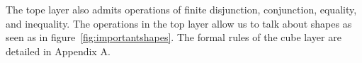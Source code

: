\documentclass[main.tex]{subfiles}
\begin{document}
The tope layer also admits operations of finite disjunction, conjunction, equality, and inequality. The 
operations in the top layer allow us to talk about shapes as seen as in figure~\ref{fig:importantshapes}. The formal rules
of the cube layer are detailed in Appendix A.


\ifSubfilesClassLoaded{%
    
    
}{}
\end{document}
